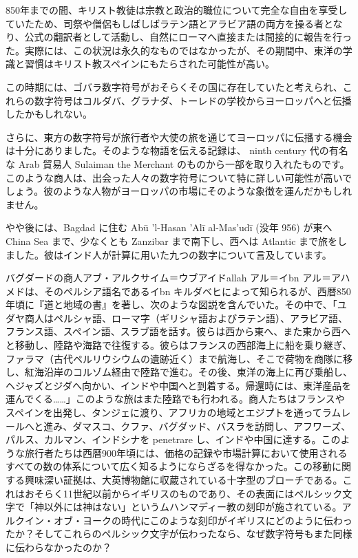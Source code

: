 \documentclass[a4paper,11pt,openany]{ltjsbook}
\begin{document}
850年までの間、キリスト教徒は宗教と政治的職位について完全な自由を享受していたため、司祭や僧侶もしばしばラテン語とアラビア語の両方を操る者となり、公式の翻訳者として活動し、自然にローマへ直接または間接的に報告を行った。実際には、この状況は永久的なものではなかったが、その期間中、東洋の学識と習慣はキリスト教スペインにもたらされた可能性が高い。

この時期には、ゴバラ数字符号がおそらくその国に存在していたと考えられ、これらの数字符号はコルダバ、グラナダ、トーレドの学校からヨーロッパへと伝播したかもしれない。

さらに、東方の数字符号が旅行者や大使の旅を通じてヨーロッパに伝播する機会は十分にありました。そのような物語を伝える記録は、 ninth century 代の有名な Arab 貿易人 Sulaiman the Merchant のものから一部を取り入れたものです。このような商人は、出会った人々の数字符号について特に詳しい可能性が高いでしょう。彼のような人物がヨーロッパの市場にそのような象徴を運んだかもしれません。

やや後には、Bagdad に住む Abū 'l-Hasan 'Alī al-Mas'udī (没年 956) が東へ China Sea まで、少なくとも Zanzibar まで南下し、西へは Atlantic まで旅をしました。彼はインド人が計算に用いた九つの数字について言及しています。

バグダードの商人アブ・アルクサイム＝ウブアイドallah アル＝イbn アル＝アハメドは、そのペルシア語名であるイbn キルダベヒによって知られるが、西暦850年頃に『道と地域の書』を著し、次のような図説を含んでいた。その中で、「ユダヤ商人はペルシャ語、ローマ字（ギリシャ語およびラテン語）、アラビア語、フランス語、スペイン語、スラブ語を話す。彼らは西から東へ、また東から西へと移動し、陸路や海路で往復する。彼らはフランスの西部海上に船を乗り継ぎ、ファラマ（古代ペルリウシウムの遺跡近く）まで航海し、そこで荷物を商隊に移し、紅海沿岸のコルゾム経由で陸路で進む。その後、東洋の海上に再び乗船し、ヘジャズとジダへ向かい、インドや中国へと到着する。帰還時には、東洋産品を運んでくる……」このような旅はまた陸路でも行われる。商人たちはフランスやスペインを出発し、タンジェに渡り、アフリカの地域とエジプトを通ってラムレールへと進み、ダマスコ、クファ、バグダッド、バスラを訪問し、アフワーズ、パルス、カルマン、インドシナを penetrare し、インドや中国に達する。このような旅行者たちは西暦900年頃には、価格の記録や市場計算において使用されるすべての数の体系について広く知るようにならざるを得なかった。この移動に関する興味深い証拠は、大英博物館に収蔵されている十字型のブローチである。これはおそらく11世紀以前からイギリスのものであり、その表面にはペルシック文字で「神以外には神はない」というムハンマディー教の刻印が施されている。アルクイン・オブ・ヨークの時代にこのような刻印がイギリスにどのように伝わったか？そしてこれらのペルシック文字が伝わったなら、なぜ数字符号もまた同様に伝わらなかったのか？
\end{document}
